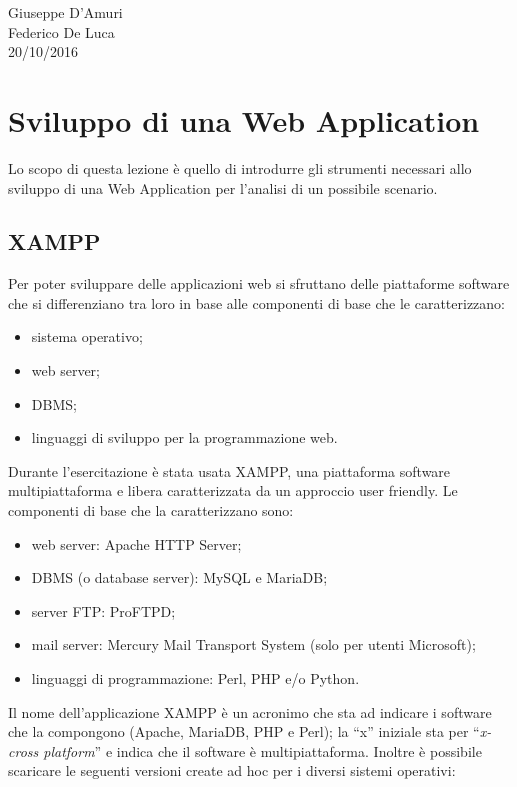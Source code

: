 \begin{flushright}Giuseppe D'Amuri\\Federico De Luca\\20/10/2016\end{flushright}


\section{Sviluppo di una Web Application}

Lo scopo di questa lezione è quello di introdurre gli strumenti necessari allo sviluppo di una Web Application per l'analisi di un possibile scenario.

\subsection{XAMPP}

Per poter sviluppare delle applicazioni web si sfruttano delle piattaforme software che si differenziano tra loro in base alle componenti di base che le caratterizzano: 

\begin{itemize}

\item sistema operativo;
\item web server;
\item DBMS;
\item linguaggi di sviluppo per la programmazione web.

\end{itemize}

Durante l'esercitazione è stata usata XAMPP, una piattaforma software multipiattaforma e libera caratterizzata da un approccio user friendly. Le componenti di base che la caratterizzano sono: 

\begin{itemize}

\item web server: Apache HTTP Server; 
\item DBMS (o database server): MySQL e MariaDB;
\item server FTP: ProFTPD;
\item mail server: Mercury Mail Transport System (solo per utenti Microsoft);
\item linguaggi di programmazione: Perl, PHP e/o Python. 

\end{itemize}

Il nome dell'applicazione XAMPP è un acronimo che sta ad indicare i software che la compongono (Apache, MariaDB, PHP e Perl); la “x” iniziale sta per “\textit{x-cross platform}” e indica che il software è multipiattaforma. Inoltre è possibile scaricare le seguenti versioni create ad hoc per i diversi sistemi operativi:

